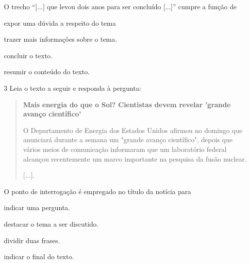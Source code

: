 O trecho ``{[}...{]} que levou dois anos para ser concluído {[}...{]}''
cumpre a função de

\begin{escolha}
\item expor uma dúvida a respeito do tema

\item trazer mais informações sobre o tema.

\item concluir o texto.

\item resumir o conteúdo do texto.
\end{escolha}


\num{3} Leia o texto a seguir e responda à pergunta:

\begin{quote}
\textbf{Mais energia do que o Sol? Cientistas devem revelar 'grande
avanço científico'}

O Departamento de Energia dos Estados Unidos afirmou no domingo que
anunciará durante a semana um "grande avanço científico", depois que
vários meios de comunicação informaram que um laboratório federal
alcançou recentemente um marco importante na pesquisa da fusão nuclear.

{[}...{]}.

\end{quote}

O ponto de interrogação é empregado no título da notícia para

\begin{escolha}
\item indicar uma pergunta.

\item destacar o tema a ser discutido.

\item dividir duas frases.

\item indicar o final do texto.
\end{escolha}

